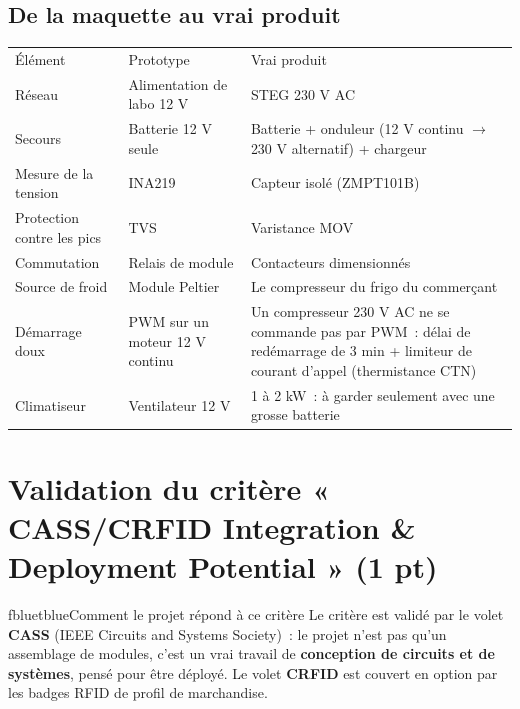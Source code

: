 \documentclass[10pt,a4paper]{article}
\begin{document}
\subsection{De la maquette au vrai produit}
\begin{tabularx}{\linewidth}{Q{3.2cm}P{4.6cm}L}
 Élément & \mdseries Prototype & \mdseries Vrai produit \\
Réseau & Alimentation de labo 12 V & STEG 230 V AC \\
Secours & Batterie 12 V seule & Batterie + onduleur (12 V continu $\rightarrow$ 230 V alternatif) + chargeur \\
Mesure de la tension & INA219 & Capteur isolé (ZMPT101B) \\
Protection contre les pics & TVS & Varistance MOV \\
Commutation & Relais de module & Contacteurs dimensionnés \\
Source de froid & Module Peltier & Le compresseur du frigo du commerçant \\
Démarrage doux & PWM sur un moteur 12 V continu & Un compresseur 230 V AC ne se commande pas par PWM~: délai de redémarrage de 3 min + limiteur de courant d'appel (thermistance CTN) \\
Climatiseur & Ventilateur 12 V & 1 à 2 kW~: à garder seulement avec une grosse batterie \\
\end{tabularx}

\section{Validation du critère « CASS/CRFID Integration \& Deployment Potential » (1 pt)}

\begin{tbox}{fblue}{tblue}{Comment le projet répond à ce critère}
Le critère est validé par le volet \textbf{CASS} (IEEE Circuits and Systems Society)~: le projet n'est pas qu'un assemblage de modules, c'est un vrai travail de \textbf{conception de circuits et de systèmes}, pensé pour être déployé. Le volet \textbf{CRFID} est couvert en option par les badges RFID de profil de marchandise.
\end{tbox}
\end{document}
